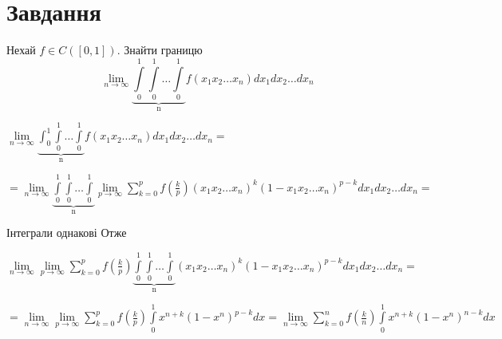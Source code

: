 
\chapter{Завдання \theHchapter}

\begin{tcolorbox}[title=Завдання]
    Нехай $f \in C([0,1])$. Знайти границю
    $$\lim_{n\rightarrow \infty}
    \underbrace{\int\limits_{0}^{1}\int\limits_{0}^{1}
    \dots\int\limits_{0}^{1}}_{\mbox{n}}
    f(x_1x_2\dots x_n) dx_1dx_2\dots dx_n $$
\end{tcolorbox}



$
\lim\limits_{n\rightarrow \infty}
\underbrace{\int_{0}^{1}\int\limits_{0}^{1}
\dots\int\limits_{0}^{1}}_{\mbox{n}}
f(x_1x_2\dots x_n) dx_1dx_2\dots dx_n=$


$=
\lim\limits_{n\rightarrow \infty}
\underbrace{\int\limits_{0}^{1}\int\limits_{0}^{1}
\dots\int\limits_{0}^{1}}_{\mbox{n}}
\lim\limits_{p\rightarrow \infty}
\sum\limits_{k = 0}^{p}
f(\frac{k}{p}) 
(x_1x_2\dots x_n)^k(1- x_1x_2\dots x_n)^{p - k}
dx_1dx_2\dots dx_n = 
$


Інтеграли однакові Отже


$\lim\limits_{n\rightarrow \infty}
\lim\limits_{p\rightarrow \infty}
\sum\limits_{k = 0}^{p}
f(\frac{k}{p}) 
\underbrace{\int\limits_{0}^{1}\int\limits_{0}^{1}
\dots\int\limits_{0}^{1}}_{\mbox{n}}
(x_1x_2\dots x_n)^k(1- x_1x_2\dots x_n)^{p - k}
dx_1dx_2\dots dx_n = $


$=
\lim\limits_{n\rightarrow \infty}
\lim\limits_{p\rightarrow \infty}
\sum\limits_{k = 0}^{p}
f(\frac{k}{p}) 
\int\limits_{0}^{1}
x^{n + k}(1- x^n)^{p - k}
dx= 
\lim\limits_{n\rightarrow \infty}
\sum\limits_{k = 0}^{n}
f(\frac{k}{n}) 
\int\limits_{0}^{1}
x^{n + k}(1- x^n)^{n - k}
dx
$